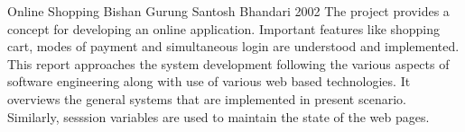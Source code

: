 \begin{conf-abstract}[]
{Online Shopping}
{ 
Bishan Gurung
Santosh Bhandari
}
{2002}
The project provides a concept for developing an online application. Important features like shopping cart, modes of payment and simultaneous login are understood and implemented.
This report approaches the system development following the various aspects of software engineering along with use of various web based technologies. It overviews the general systems that are implemented in present scenario. Similarly, sesssion variables are used to maintain the state of the web pages.
\end{conf-abstract}	
